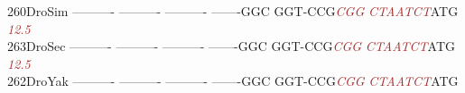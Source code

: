 \documentclass[11pt,twoside,reqno,a4paper]{article}
\begin{document}
{260\hspace*{1\charwidth}DroSim	----------	----------	----------	-------GGC	GGT-CCG\textit{\textcolor{brown}{C}}\textit{\textcolor{brown}{G}}\textit{\textcolor{brown}{G}}	\textit{\textcolor{brown}{C}}\textit{\textcolor{brown}{T}}\textit{\textcolor{brown}{A}}\textit{\textcolor{brown}{A}}\textit{\textcolor{brown}{T}}\textit{\textcolor{brown}{C}}\textit{\textcolor{brown}{T}}ATG	\\
\hspace*{4\charwidth}\hspace*{7\charwidth}\hspace*{1\charwidth}\hspace*{1\charwidth}\hspace*{1\charwidth}\hspace*{1\charwidth}\hspace*{47\charwidth}\textit{\textcolor{brown}{12.5}}\hspace*{1\charwidth}\hspace*{1\charwidth}\\
263\hspace*{1\charwidth}DroSec	----------	----------	----------	-------GGC	GGT-CCG\textit{\textcolor{brown}{C}}\textit{\textcolor{brown}{G}}\textit{\textcolor{brown}{G}}	\textit{\textcolor{brown}{C}}\textit{\textcolor{brown}{T}}\textit{\textcolor{brown}{A}}\textit{\textcolor{brown}{A}}\textit{\textcolor{brown}{T}}\textit{\textcolor{brown}{C}}\textit{\textcolor{brown}{T}}ATG	\\
\hspace*{4\charwidth}\hspace*{7\charwidth}\hspace*{1\charwidth}\hspace*{1\charwidth}\hspace*{1\charwidth}\hspace*{1\charwidth}\hspace*{47\charwidth}\textit{\textcolor{brown}{12.5}}\hspace*{1\charwidth}\hspace*{1\charwidth}\\
262\hspace*{1\charwidth}DroYak	----------	----------	----------	-------GGC	GGT-CCG\textit{\textcolor{brown}{C}}\textit{\textcolor{brown}{G}}\textit{\textcolor{brown}{G}}	\textit{\textcolor{brown}{C}}\textit{\textcolor{brown}{T}}\textit{\textcolor{brown}{A}}\textit{\textcolor{brown}{A}}\textit{\textcolor{brown}{T}}\textit{\textcolor{brown}{C}}\textit{\textcolor{brown}{T}}ATG	\\
}
\end{document}
